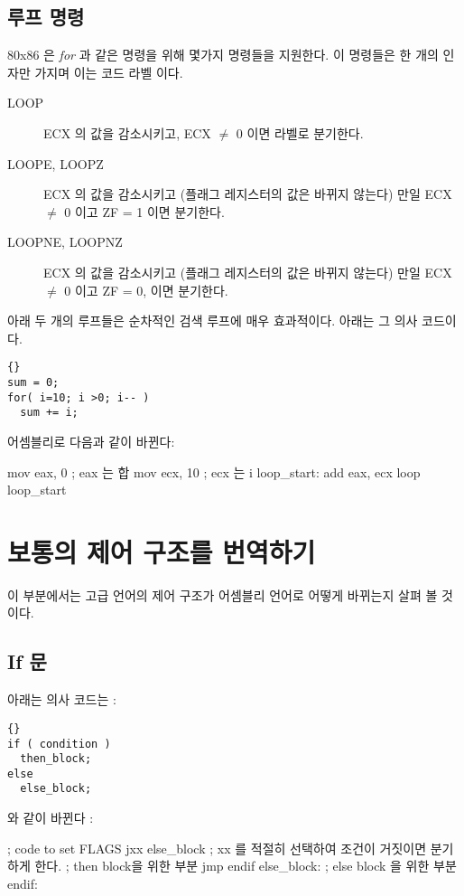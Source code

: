 \subsection{루프 명령}

80x86 은 \emph{for} 과 같은 명령을 위해 몇가지 명령들을 지원한다. 이 명령들은 
한 개의 인자만 가지며 이는 코드 라벨 이다. 

\begin{description}
\item[LOOP] 
ECX 의 값을 감소시키고, ECX $\neq$ 0 이면 라벨로 분기한다. 

\item[LOOPE, LOOPZ]
 
ECX 의 값을 감소시키고 (플래그 레지스터의 값은 바뀌지 않는다) 만일 
                    ECX $\neq$ 0 이고 ZF = 1 이면 분기한다. 
\item[LOOPNE, LOOPNZ]
 
ECX 의 값을 감소시키고 (플래그 레지스터의 값은 바뀌지 않는다) 만일 ECX $\neq$ 0 
                      이고 ZF = 0, 이면 분기한다. 
\end{description}

아래 두 개의 루프들은 순차적인 검색 루프에 매우 효과적이다. 아래는 그 의사 코드이다.

\begin{lstlisting}[stepnumber=0]{}
sum = 0;
for( i=10; i >0; i-- )
  sum += i;
\end{lstlisting}
\noindent 어셈블리로 다음과 같이 바뀐다:
\begin{AsmCodeListing}[frame=none]
      mov    eax, 0          ; eax 는 합
      mov    ecx, 10         ; ecx 는 i
loop_start:
      add    eax, ecx
      loop   loop_start
\end{AsmCodeListing}

\section{보통의 제어 구조를 번역하기}

이 부분에서는 고급 언어의 제어 구조가 어셈블리 언어로 어떻게 바뀌는지 살펴 볼 
것이다. 

\subsection{If 문}
아래는 의사 코드는 : 
\begin{lstlisting}[stepnumber=0]{}
if ( condition )
  then_block;
else
  else_block;
\end{lstlisting}
\noindent 와 같이 바뀐다 : 
\begin{AsmCodeListing}[frame=none]
      ; code to set FLAGS
      jxx    else_block    ; xx 를 적절히 선택하여 조건이 거짓이면 분기하게 한다. 
      ; then block을 위한 부분
      jmp    endif
else_block:
      ; else block 을 위한 부분 
endif:
\end{AsmCodeListing}

